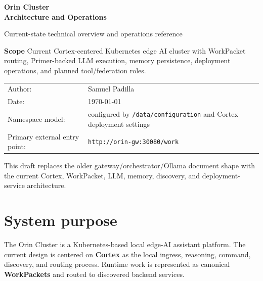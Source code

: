 \documentclass[11pt,a4paper]{article}
\begin{document}
\begin{titlepage}
  \centering
  \vspace*{2.2cm}
  {\fontsize{26}{30}\selectfont\bfseries Orin Cluster\\Architecture and Operations\par}
  \vspace{0.6cm}
  {\large Current-state technical overview and operations reference\par}
  \vspace{1.1cm}

  \begin{infobox}
  \textbf{Scope}\newline
  Current Cortex-centered Kubernetes edge AI cluster with WorkPacket routing, Primer-backed LLM execution, memory persistence, deployment operations, and planned tool/federation roles.
  \end{infobox}

  \vspace{0.8cm}
  \begin{tabular}{@{}ll@{}}
  Author: & Samuel Padilla \\
  Date: & \today \\
  Namespace model: & configured by \texttt{/data/configuration} and Cortex deployment settings \\
  Primary external entry point: & \texttt{http://orin-gw:30080/work} \\
  \end{tabular}

  \vfill

  \begin{infobox}
  This draft replaces the older gateway/orchestrator/Ollama document shape with the current Cortex, WorkPacket, LLM, memory, discovery, and deployment-service architecture.
  \end{infobox}
\end{titlepage}

\tableofcontents
\newpage

\section{System purpose}
The Orin Cluster is a Kubernetes-based local edge-AI assistant platform. The current design is centered on \textbf{Cortex} as the local ingress, reasoning, command, discovery, and routing process. Runtime work is represented as canonical \textbf{WorkPackets} and routed to discovered backend services.
\end{document}
